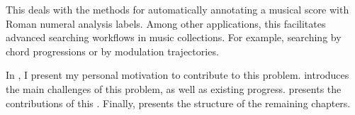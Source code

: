 

This \thesisdiss{} deals with the methods for automatically
annotating a musical score with Roman numeral analysis
labels. Among other applications, this facilitates advanced
searching workflows in music collections. For example,
searching by chord progressions or by modulation
trajectories.

In , I present my personal motivation to
contribute to this problem.  introduces
the main challenges of this problem, as well as existing
progress.  presents the
contributions of this \thesisdiss{}. Finally,
 presents the structure of the
remaining chapters.
